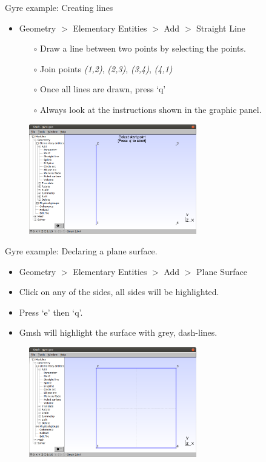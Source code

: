 \documentclass[t]{beamer}
\begin{document}
\begin{frame}{Gyre example: Creating lines}
\begin{itemize}
\item Geometry $>$ Elementary Entities $>$ Add $>$ Straight Line
\begin{itemize}
\item[$\circ$] Draw a line between two points by selecting the points.
\item[$\circ$] Join points \emph{(1,2)}, \emph{(2,3)}, \emph{(3,4)}, \emph{(4,1)}
\item[$\circ$] Once all lines are drawn, press `q'
\item[$\circ$] Always look at the instructions shown in the graphic panel.
\end{itemize}
\end{itemize}
\begin{figure}[htbp]
 \centering
  \includegraphics[width=0.65\textwidth]{figures/Gmsh_drawing_lines.png}
\end{figure}
\end{frame}

\begin{frame}{Gyre example: Declaring a plane surface.}
\begin{itemize}
\item Geometry $>$ Elementary Entities $>$ Add $>$ Plane Surface
\item Click on any of the sides, all sides will be highlighted.
\item Press `e' then `q'.
\item Gmsh will highlight the surface with grey, dash-lines.
\end{itemize}
\begin{figure}[htbp]
 \centering
  \includegraphics[width=0.65\textwidth]{figures/2d-example-surface}
\end{figure}
\end{frame}
\end{document}
